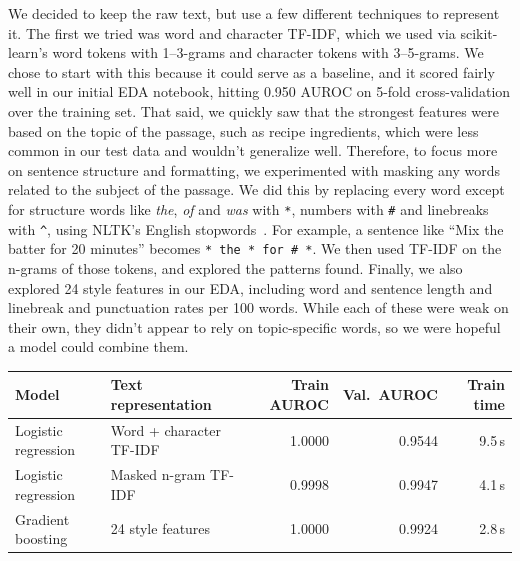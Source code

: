 We decided to keep the raw text, but use a few different techniques to represent it.
The first we tried was word and character TF-IDF, which we used via scikit-learn's word tokens with 1--3-grams and character tokens with 3--5-grams. 
We chose to start with this because it could serve as a baseline, and it scored fairly well in our initial EDA notebook, hitting 0.950 AUROC on 5-fold cross-validation over the training set.
That said, we quickly saw that the strongest features were based on the topic of the passage, such as recipe ingredients, which were less common in our test data and wouldn't generalize well.
Therefore, to focus more on sentence structure and formatting, we experimented with masking any words related to the subject of the passage.
We did this by replacing every word except for structure words like \emph{the}, \emph{of} and \emph{was} with \texttt{*}, numbers with \texttt{\#} and linebreaks with \texttt{\^{}}, using NLTK's English stopwords~\cite{bird2009nltk}.
For example, a sentence like ``Mix the batter for 20 minutes'' becomes \texttt{* the * for \# *}. We then used TF-IDF on the n-grams of those tokens, and explored the patterns found.
Finally, we also explored 24 style features in our EDA, including word and sentence length and linebreak and punctuation rates per 100 words. 
While each of these were weak on their own, they didn't appear to rely on topic-specific words, so we were hopeful a model could combine them.

\begin{tabularx}{\linewidth}{@{}p{1.25in}Yrrr@{}}\toprule Model & Text representation & Train AUROC & Val.\ AUROC & Train time \\ \midrule
Logistic regression & Word + character TF-IDF & 1.0000 & 0.9544 & 9.5\,s \\
Logistic regression & Masked n-gram TF-IDF & 0.9998 & 0.9947 & 4.1\,s \\
Gradient boosting & 24 style features & 1.0000 & 0.9924 & 2.8\,s \\
\bottomrule\end{tabularx}


